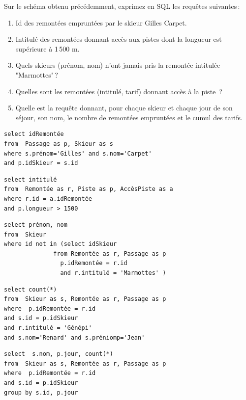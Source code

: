 Sur le schéma obtenu précédemment, exprimez en SQL les requêtes suivantes\,:

\begin{enumerate}
  \item Id des remontées empruntées par le skieur Gilles Carpet.
  
   \item Intitulé des remontées donnant accès aux pistes dont la longueur est 
         supérieure à 1\,500 m. 

   \item Quels skieurs (prénom, nom) n'ont jamais pris la remontée intitulée "Marmottes"\,?


   \item Quelles sont les remontées  (intitulé, tarif)
    donnant accès à la piste \,?
   

   \item Quelle est la requête donnant, pour chaque skieur
        et chaque jour de son séjour, son nom, 
       le nombre de remontées empruntées et le cumul des tarifs.
\end{enumerate}


\begin{solution}
\begin{verbatim}
select idRemontée 
from  Passage as p, Skieur as s
where s.prénom='Gilles' and s.nom='Carpet'
and p.idSkieur = s.id
\end{verbatim}

\begin{verbatim}
select intitulé 
from  Remontée as r, Piste as p, AccèsPiste as a 
where r.id = a.idRemontée 
and p.longueur > 1500
\end{verbatim}

\begin{verbatim}
select prénom, nom
from  Skieur 
where id not in (select idSkieur
              from Remontée as r, Passage as p
                p.idRemontée = r.id
                and r.intitulé = 'Marmottes' )
\end{verbatim}

\begin{verbatim}
select count(*)
from  Skieur as s, Remontée as r, Passage as p
where  p.idRemontée = r.id
and s.id = p.idSkieur
and r.intitulé = 'Génépi' 
and s.nom='Renard' and s.préniomp='Jean'
\end{verbatim}


\begin{verbatim}
select  s.nom, p.jour, count(*)
from  Skieur as s, Remontée as r, Passage as p
where  p.idRemontée = r.id
and s.id = p.idSkieur
group by s.id, p.jour
\end{verbatim}



\end{solution}



